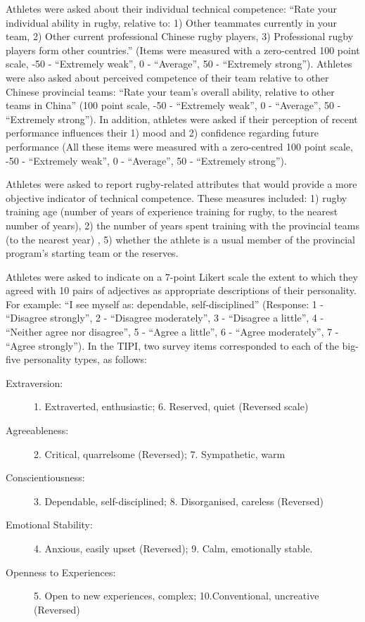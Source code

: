 Athletes were asked about their individual technical competence: ``Rate your individual ability in rugby, relative to: 1) Other teammates currently in your team, 2) Other current professional Chinese rugby players, 3) Professional rugby players form other countries.'' (Items were measured with a zero-centred 100 point scale, -50 - ``Extremely weak'', 0 - ``Average'', 50 - ``Extremely strong'').  Athletes were also asked about perceived competence of their team relative to other Chinese provincial teams: ``Rate your team's overall ability, relative to other teams in China'' (100 point scale, -50 - ``Extremely weak'', 0 - ``Average'', 50 - ``Extremely strong'').  In addition, athletes were asked if their perception of recent performance influences their 1) mood and 2) confidence regarding future performance (All these items were measured with a zero-centred 100 point scale, -50 - ``Extremely weak'', 0 - ``Average'', 50 - ``Extremely strong'').

Athletes were asked to report rugby-related attributes that would provide a more objective indicator of technical competence. These measures included: 1) rugby training age (number of years of experience training for rugby, to the nearest number of years), 2) the number of years spent training with the provincial teams (to the nearest year) , 5) whether the athlete is a usual member of the provincial program's starting team or the reserves.


Athletes were asked to indicate on a 7-point Likert scale the extent to which they agreed with 10 pairs of adjectives as appropriate descriptions of their personality. For example: ``I see myself as: dependable, self-disciplined'' (Response: 1 - ``Disagree strongly'', 2 - ``Disagree moderately'',  3 - ``Disagree a little'', 4 - ``Neither agree nor disagree'', 5 - ``Agree a little'', 6 - ``Agree moderately'', 7 - ``Agree strongly''). In the TIPI, two survey items corresponded to each of the big-five personality types, as follows:

\begin{description}
\item [Extraversion:] 1. Extraverted, enthusiastic; 6. Reserved, quiet (Reversed scale)
\item [Agreeableness:] 2. Critical, quarrelsome (Reversed); 7. Sympathetic, warm
\item [Conscientiousness:] 3. Dependable, self-disciplined; 8. Disorganised, careless (Reversed)
\item [Emotional Stability:] 4. Anxious, easily upset (Reversed); 9. Calm, emotionally stable.
\item [Openness to Experiences:] 5. Open to new experiences, complex; 10.Conventional, uncreative (Reversed)
\end{description}



